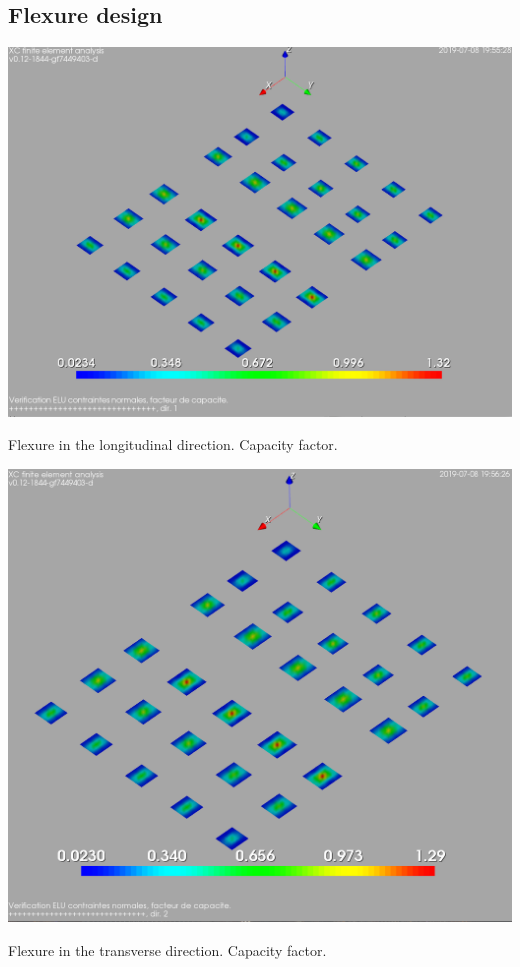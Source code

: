 \subsection{Flexure design}

\begin{table}
    \includegraphics[width=\linewidth]{figures/flexure_design_cf_long_direction}
    \caption{Flexure in the longitudinal direction. Capacity factor.}\label{tb_flexure_design_cf_long_direction}
\end{table}

\begin{table}
    \includegraphics[width=\linewidth]{figures/flexure_design_cf_transv_direction}
    \caption{Flexure in the transverse direction. Capacity factor.}\label{tb_flexure_design_cf_transv_direction}
\end{table}

